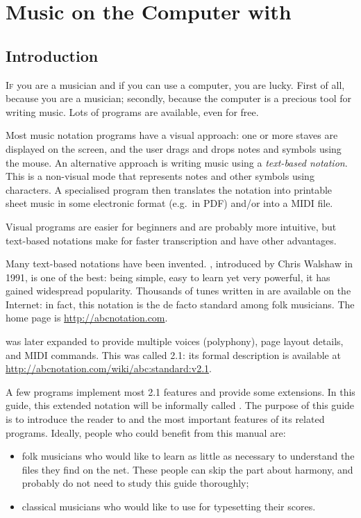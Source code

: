 \documentclass[a4paper,fullpage,12pt]{book}
\begin{document}
\chapter{Music on the Computer with \ABCPLUS}

\section{Introduction}

\lettrine{I}{f} you are a musician and if you can use a computer, you
are lucky. First of all, because you are a musician; secondly, because
the computer is a precious tool for writing music. Lots of programs
are available, even for free.

Most music notation programs have a visual approach: one or more
staves are displayed on the screen, and the user drags and drops notes
and symbols using the mouse. An alternative approach is writing music
using a \emph{text-based notation}. This is a non-visual mode that
represents notes and other symbols using characters. A specialised
program then translates the notation into printable sheet music in
some electronic format (e.g.\ in PDF) and/or into a MIDI file.

Visual programs are easier for beginners and are probably more
intuitive, but text-based notations make for faster transcription and
have other advantages.

Many text-based notations have been invented. \ABC{}, introduced by
Chris Walshaw in 1991, is one of the best: being simple, easy to learn
yet very powerful, it has gained widespread popularity. Thousands of
tunes written in \ABC{} are available on the Internet: in fact,
this notation is the de facto standard among folk musicians. The
\ABC{} home page is \url{http://abcnotation.com}.

\ABC{} was later expanded to provide multiple voices
(po\-ly\-pho\-ny), page layout details, and MIDI commands. This was
called \ABC{} 2.1: its formal description is available at
\url{http://abcnotation.com/wiki/abc:standard:v2.1}.

A few programs implement most \ABC{} 2.1 features and provide some
extensions. In this guide, this extended notation will be informally
called \ABCPLUS. The purpose of this guide is to introduce the reader to
\ABCPLUS{} and the most important features of its related programs.
Ideally, people who could benefit from this manual are:

\begin{itemize}
  
  \item folk musicians who would like to learn as little \ABC{} as
  necessary to understand the files they find on the net. These people
  can skip the part about harmony, and probably do not need to study
  this guide thoroughly;
  
  \item classical musicians who would like to use \ABCPLUS{} for
  typesetting their scores.
  
\end{itemize}
\end{document}
